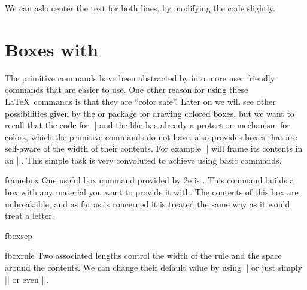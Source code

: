 {\noindent
{}%

We can aslo center the text for both lines, by modifying the code slightly.
\begin{teX}
\noindent
{}%
\end{teX}


\noindent
{}%



\chapter{Boxes with \protect\LaTeXe}

The \tex primitive commands have been abstracted by \latexe into more user friendly commands that are easier to use. One other reason for using these \LaTeX\ commands is that they are ``color safe''. Later on we will see other possibilities given by the  or  package for drawing colored boxes, but we want to recall that the code for |\makebox| and the like has already a protection mechanism for colors, which the primitive commands do not have. \latexe also provides boxes that are self-aware of the width of their contents. For example |\fbox| will frame its contents in an |\hbox|. This simple task is very convoluted to achieve using basic \tex commands. 

\begin{docCommand}{framebox} {}
One useful box command provided by \latex2e is \cmd{\framebox}. This command builds a box with any material you want to provide it with. The contents of this box are unbreakable, and as far as \tex is concerned it is treated the same way as it would treat a letter. 
\end{docCommand}

\begin{docCommand}{fboxsep}{}
\end{docCommand}
\begin{docCommand}{fboxrule}{}
Two associated lengths control the width of the rule and the space around the contents. We can change their default value by using |\setlength{\fboxsep}{0pt}| or just simply |\fboxsep=0pt| or even ||. 
\end{docCommand}


}
